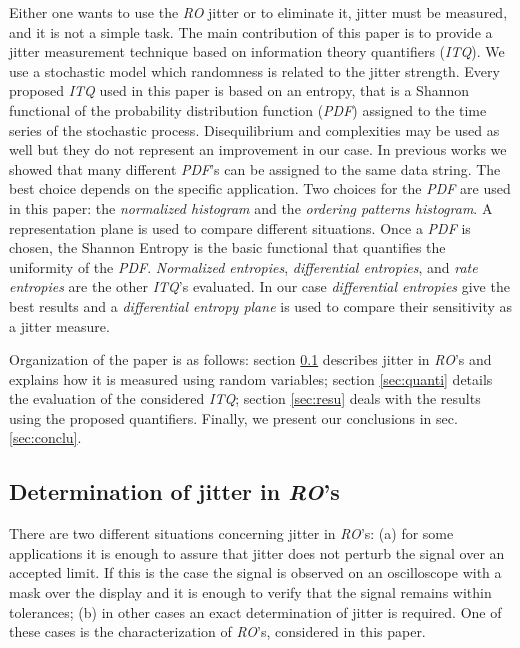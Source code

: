 Either one wants to use the \emph{RO} jitter or to eliminate it, jitter must be measured, and it is not a simple task. The main contribution of this paper is to provide a jitter measurement technique based on information theory quantifiers (\emph{ITQ}). We use a stochastic model which randomness is related to the jitter strength. Every proposed \emph{ITQ} used in this paper is based on an entropy, that is a Shannon functional of the probability distribution function (\emph{PDF}) assigned to the time series of the stochastic process. Disequilibrium and complexities may be used as well \cite{Amigo2005,Rosso2007b} but they do not represent an improvement in our case. In previous works \cite{DeMicco2008,DeMicco2009} we showed that many different \emph{PDF}'s can be assigned to the same data string. The best choice depends on the specific application. Two choices for the \emph{PDF} are used in this paper: the \emph{normalized histogram} and the \emph{ordering patterns histogram}. A representation plane is used to compare different situations. Once a \emph{PDF} is chosen, the Shannon Entropy is the basic functional that quantifies the uniformity of the \emph{PDF}. \emph{Normalized entropies}, \emph{differential entropies}, and \emph{rate entropies} are the other \emph{ITQ}'s evaluated. In our case \emph{differential entropies} give the best results and a \emph{differential entropy plane} is used to compare their sensitivity as a jitter measure.


Organization of the paper is as follows: section \ref{sec:jitter} describes jitter in \emph{RO}'s and explains how it is measured using random variables; section \ref{sec:quanti} details the evaluation of the considered \emph{ITQ}; section \ref{sec:resu} deals with the results using the proposed quantifiers. Finally, we present our conclusions in sec. \ref{sec:conclu}.

\subsection{Determination of jitter in \emph{RO}'s}
\label{sec:jitter}

There are two different situations concerning jitter in \emph{RO}'s: (a) for some applications it is enough to assure that jitter does not perturb the signal over an accepted limit. If this is the case the signal is observed on an oscilloscope with a mask over the display and it is enough to verify that the signal remains within tolerances; (b) in other cases an exact determination of jitter is required. One of these cases is the characterization of \emph{RO}'s, considered in this paper. 

